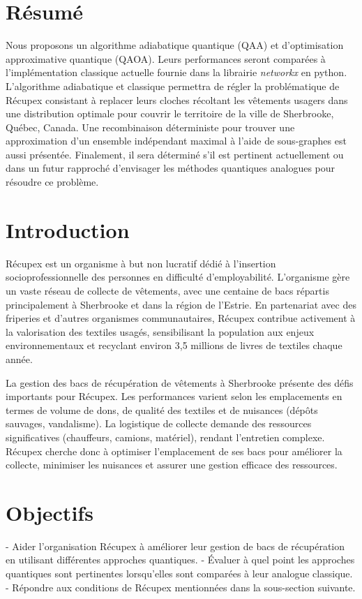 \documentclass[11pt]{article}
\begin{document}

\tableofcontents
\newpage
\section*{Résumé}
Nous proposons un algorithme adiabatique quantique (QAA) et d'optimisation approximative quantique (QAOA). Leurs performances seront comparées à l'implémentation classique actuelle fournie dans la librairie \textit{networkx} en python. L'algorithme adiabatique et classique permettra de régler la problématique de Récupex consistant à replacer leurs cloches récoltant les vêtements usagers dans une distribution optimale pour couvrir le territoire de la ville de Sherbrooke, Québec, Canada. Une recombinaison déterministe pour trouver une approximation d'un ensemble indépendant maximal à l'aide de sous-graphes est aussi présentée. Finalement, il sera déterminé s'il est pertinent actuellement ou dans un futur rapproché d'envisager les méthodes quantiques analogues pour résoudre ce problème.

\section{Introduction}
Récupex est un organisme à but non lucratif dédié à l’insertion socioprofessionnelle des personnes en difficulté d’employabilité. L’organisme gère un vaste réseau de collecte de vêtements, avec une centaine de bacs répartis principalement à Sherbrooke et dans la région de l’Estrie. En partenariat avec des friperies et d’autres organismes communautaires, Récupex contribue activement à la valorisation des textiles usagés, sensibilisant la population aux enjeux environnementaux et recyclant environ 3,5 millions de livres de textiles chaque année.

La gestion des bacs de récupération de vêtements à Sherbrooke présente des défis importants pour Récupex. Les performances varient selon les emplacements en termes de volume de dons, de qualité des textiles et de nuisances (dépôts sauvages, vandalisme). La logistique de collecte demande des ressources significatives (chauffeurs, camions, matériel), rendant l'entretien complexe. Récupex cherche donc à optimiser l'emplacement de ses bacs pour améliorer la collecte, minimiser les nuisances et assurer une gestion efficace des ressources.

\section{Objectifs}
- Aider l'organisation Récupex à améliorer leur gestion de bacs de récupération en utilisant différentes approches quantiques.
- Évaluer à quel point les approches quantiques sont pertinentes lorsqu’elles sont comparées à leur analogue classique.
- Répondre aux conditions de Récupex mentionnées dans la sous-section suivante.
\end{document}

